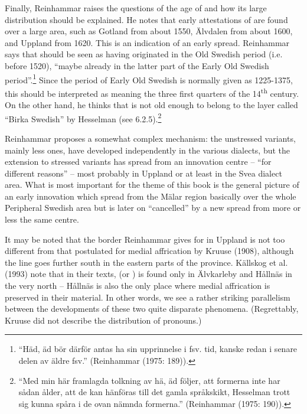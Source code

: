 Finally, Reinhammar raises the questions of the age of  and how its large distribution should be explained. He notes that early attestations of  are found over a large area, such as Gotland from about 1550, Älvdalen from about 1600, and Uppland from 1620. This is an indication of an early spread. Reinhammar says that  should be seen as having originated in the Old Swedish period (i.e. before 1520), “maybe already in the latter part of the Early Old Swedish period”.\footnote{ “Häd, äd bör därför antas ha sin upprinnelse i fsv. tid, kanske redan i senare delen av äldre fsv.” (Reinhammar (1975: 189)).} Since the period of Early Old Swedish is normally given as 1225-1375, this should be interpreted as meaning the three first quarters of the 14\textsuperscript{th} century. On the other hand, he thinks that is not old enough to belong to the layer called “Birka Swedish” by Hesselman (see 6.2.5).\footnote{ “Med min här framlagda tolkning av hä, äd följer, att formerna inte har sådan ålder, att de kan hänföras till det gamla språkskikt, Hesselman trott sig kunna spåra i de ovan nämnda formerna.” (Reinhammar (1975: 190)).} 

 Reinhammar proposes a somewhat complex mechanism: the unstressed variants, mainly less ones, have developed independently in the various dialects, but the extension to stressed variants has spread from an innovation centre – “for different reasons” –  most probably in Uppland or at least in the Svea dialect area. What is most important for the theme of this book is the general picture of an early innovation which spread from the Mälar region basically over the whole Peripheral Swedish area but is later on “cancelled” by a new spread from more or less the same centre. 

It may be noted that the border Reinhammar gives for  in Uppland is not too different from that postulated for medial affrication by Kruuse (1908), although the  line goes further south in the eastern parts of the province. Källskog et al. (1993) note that in their texts,  (or ) is found only in Älvkarleby and Hållnäs in the very north – Hållnäs is also the only place where medial affrication is preserved in their material. In other words, we see a rather striking parallelism between the developments of these two quite disparate phenomena. (Regrettably, Kruuse did not describe the distribution of pronouns.)

